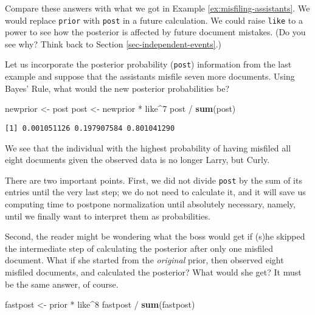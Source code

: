\documentclass[]{book}
\newenvironment{Shaded}{\begin{snugshade}}{\end{snugshade}}
\newcommand{\KeywordTok}[1]{\textcolor[rgb]{0.13,0.29,0.53}{\textbf{{#1}}}}
\newcommand{\DecValTok}[1]{\textcolor[rgb]{0.00,0.00,0.81}{{#1}}}
\newcommand{\StringTok}[1]{\textcolor[rgb]{0.31,0.60,0.02}{{#1}}}
\newcommand{\NormalTok}[1]{{#1}}
\numberwithin{equation}{chapter}
\numberwithin{figure}{chapter}
\theoremstyle{plain}
\theoremstyle{definition}
\theoremstyle{remark}
\theoremstyle{definition}
\theoremstyle{definition}
\theoremstyle{remark}
\let\BeginKnitrBlock\begin \let\EndKnitrBlock\end
\begin{document}
Compare these answers with what we got in Example
\ref{ex:misfiling-assistants}. We would replace \texttt{prior} with
\texttt{post} in a future calculation. We could raise \texttt{like} to a
power to see how the posterior is affected by future document mistakes.
(Do you see why? Think back to Section \ref{sec-independent-events}.)

\bigskip

\BeginKnitrBlock{example}
\protect\hypertarget{ex:unnamed-chunk-181}{}{\label{ex:unnamed-chunk-181}}Let
us incorporate the posterior probability (\texttt{post}) information
from the last example and suppose that the assistants misfile seven more
documents. Using Bayes' Rule, what would the new posterior probabilities
be?
\EndKnitrBlock{example}

\begin{Shaded}
\begin{Highlighting}[]
\NormalTok{newprior <-}\StringTok{ }\NormalTok{post}
\NormalTok{post <-}\StringTok{ }\NormalTok{newprior *}\StringTok{ }\NormalTok{like^}\DecValTok{7}
\NormalTok{post /}\StringTok{ }\KeywordTok{sum}\NormalTok{(post)}
\end{Highlighting}
\end{Shaded}

\begin{verbatim}
[1] 0.001051126 0.197907584 0.801041290
\end{verbatim}

We see that the individual with the highest probability of having
misfiled all eight documents given the observed data is no longer Larry,
but Curly.

There are two important points. First, we did not divide \texttt{post}
by the sum of its entries until the very last step; we do not need to
calculate it, and it will save us computing time to postpone
normalization until absolutely necessary, namely, until we finally want
to interpret them as probabilities.

Second, the reader might be wondering what the boss would get if (s)he
skipped the intermediate step of calculating the posterior after only
one misfiled document. What if she started from the \emph{original}
prior, then observed eight misfiled documents, and calculated the
posterior? What would she get? It must be the same answer, of course.

\begin{Shaded}
\begin{Highlighting}[]
\NormalTok{fastpost <-}\StringTok{ }\NormalTok{prior *}\StringTok{ }\NormalTok{like^}\DecValTok{8}
\NormalTok{fastpost /}\StringTok{ }\KeywordTok{sum}\NormalTok{(fastpost)}
\end{Highlighting}
\end{Shaded}
\end{document}
